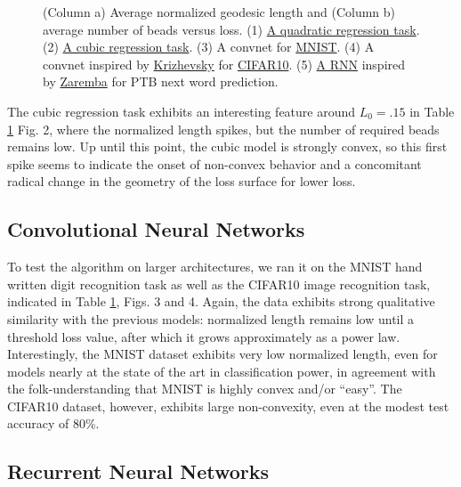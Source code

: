 \begin{figure}
  \caption{(Column a) Average normalized geodesic length and (Column b) average number of beads versus loss. (1) \href{github.com/danielfreeman11/convex-nets/tree/master/LaunchScripts/QUADRATIC.py}{A quadratic regression task}. (2) \href{github.com/danielfreeman11/convex-nets/tree/master/LaunchScripts/CUBIC.py}{A cubic regression task}. (3) A convnet for \href{github.com/danielfreeman11/convex-nets/tree/master/LaunchScripts/MNIST.py}{MNIST}. (4) A convnet inspired by \href{www.cs.toronto.edu/\%7Ekriz/cifar.html}{Krizhevsky} for \href{github.com/danielfreeman11/convex-nets/tree/master/LaunchScripts/CIFAR10.py}{CIFAR10}. (5) \href{github.com/danielfreeman11/convex-nets/tree/master/LaunchScripts/PTBRNN.py}{A RNN} inspired by \href{arxiv.org/pdf/1409.2329.pdf}{Zaremba} for PTB next word prediction.}
  \label{FigTable}
\end{figure}

 
 The cubic regression task exhibits an interesting feature around $L_0=.15$ in Table \ref{FigTable} Fig. 2, where the normalized length spikes, but the number of required beads remains low.  Up until this point, the cubic model is strongly convex, so this first spike seems to indicate the onset of non-convex behavior and a concomitant radical change in the geometry of the loss surface for lower loss.
  
 
\subsection{Convolutional Neural Networks}
\label{sec:CNN}

 To test the algorithm on larger architectures, we ran it on the MNIST hand written digit recognition task as well as the CIFAR10 image recognition task, indicated in Table \ref{FigTable}, Figs. 3 and 4.  Again, the data exhibits strong qualitative similarity with the previous models: normalized length remains low until a threshold loss value, after which it grows approximately as a power law.  Interestingly, the MNIST dataset exhibits very low normalized length, even for models nearly at the state of the art in classification power, in agreement with the folk-understanding that MNIST is highly convex and/or ``easy''.  The CIFAR10 dataset, however, exhibits large non-convexity, even at the modest test accuracy of 80\%.


\subsection{Recurrent Neural Networks}

